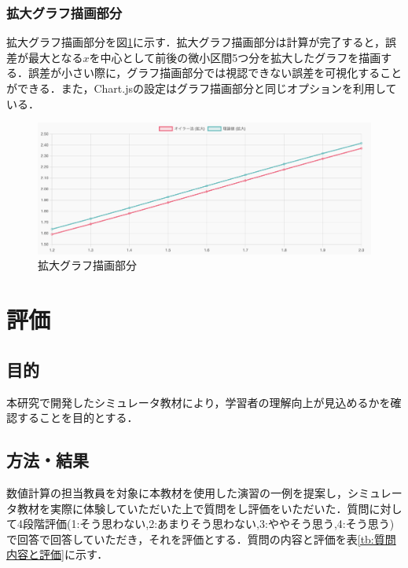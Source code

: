 \documentclass[a4paper, 12pt]{ltjsarticle}
\begin{document}
\clearpage

\subsubsection{拡大グラフ描画部分}
拡大グラフ描画部分を図\ref{fig:拡大グラフ描画部分}に示す．拡大グラフ描画部分は計算が完了すると，誤差が最大となる$x$を中心として前後の微小区間5つ分を拡大したグラフを描画する．誤差が小さい際に，グラフ描画部分では視認できない誤差を可視化することができる．また，Chart.jsの設定はグラフ描画部分と同じオプションを利用している．

\begin{figure}[h]
\begin{center}
\includegraphics[clip,width=\textwidth,keepaspectratio]{sim-kakudai-gurafu.png}
\end{center}
\caption{拡大グラフ描画部分}
\label{fig:拡大グラフ描画部分}
\end{figure}
\clearpage
\section{評価}
\subsection{目的}
本研究で開発したシミュレータ教材により，学習者の理解向上が見込めるかを確認することを目的とする．
\subsection{方法・結果}
数値計算の担当教員を対象に本教材を使用した演習の一例を提案し，シミュレータ教材を実際に体験していただいた上で質問をし評価をいただいた．質問に対して4段階評価(1:そう思わない,2:あまりそう思わない,3:ややそう思う,4:そう思う)で回答で回答していただき，それを評価とする．質問の内容と評価を表\ref{tb:質問内容と評価}に示す．
\end{document}
